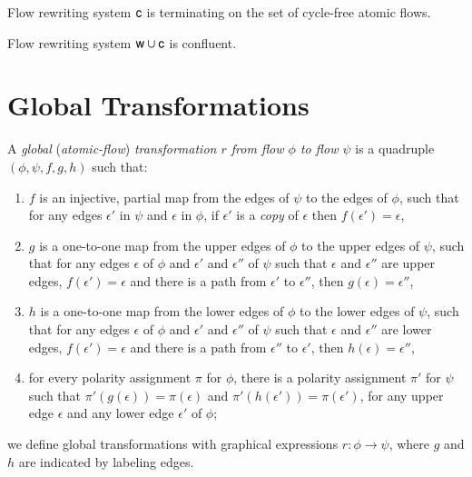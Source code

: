 \begin{theorem}\label{TheoCTerm}
Flow rewriting system\/ ${\mathsf c}$ is terminating on the set of cycle-free atomic flows.
\end{theorem}

\begin{theorem}\label{TheoWCConf}
Flow rewriting system\/ ${\mathsf w}\cup{\mathsf c}$ is confluent.
\end{theorem}

\section{Global Transformations}

\begin{definition}
A \emph{global} (\emph{atomic-flow}) \emph{transformation $r$ from flow $\phi$ to flow $\psi$} is a quadruple $(\phi,\psi,f,g,h)$ such that:
\begin{enumerate}
\item $f$ is an injective, partial map from the edges of $\psi$ to the edges of $\phi$, such that for any edges $\epsilon'$ in $\psi$ and $\epsilon$ in $\phi$, if $\epsilon'$ is a \emph{copy} of $\epsilon$ then $f(\epsilon')=\epsilon$,
\item $g$ is a one-to-one map from the upper edges of $\phi$ to the upper edges of $\psi$, such that for any edges $\epsilon$ of $\phi$ and $\epsilon'$ and $\epsilon''$ of $\psi$ such that $\epsilon$ and $\epsilon''$ are upper edges, $f(\epsilon')=\epsilon$ and there is a path from $\epsilon'$ to $\epsilon''$, then $g(\epsilon)=\epsilon''$,
\item $h$ is a one-to-one map from the lower edges of $\phi$ to the lower edges of $\psi$, such that for any edges $\epsilon$ of $\phi$ and $\epsilon'$ and $\epsilon''$ of $\psi$ such that $\epsilon$ and $\epsilon''$ are lower edges, $f(\epsilon')=\epsilon$ and there is a path from $\epsilon''$ to $\epsilon'$, then $h(\epsilon)=\epsilon''$,
\item for every polarity assignment $\pi$ for $\phi$, there is a polarity assignment $\pi'$ for $\psi$ such that $\pi'(g(\epsilon))=\pi(\epsilon)$ and $\pi'(h(\epsilon'))=\pi(\epsilon')$, for any upper edge $\epsilon$ and any lower edge $\epsilon'$ of $\phi$;
\end{enumerate}
we define global transformations with graphical expressions $r\colon\phi\to\psi$, where $g$ and $h$ are indicated by labeling edges.
\end{definition}

